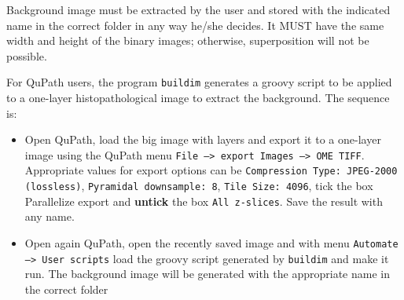 \documentclass[11pt]{report}
\begin{document}
\begin{enumerate}
Background image must be extracted by the user and stored with the indicated name
in the correct folder in any way he/she decides. It MUST have the same width and
height of the binary images; otherwise, superposition will not be possible.

For QuPath users, the program {\tt buildim} generates a groovy script to be applied to 
a one-layer histopathological image to extract the background. The sequence is:
\begin{itemize}
\item Open QuPath, load the big image with layers and export it to a one-layer
image using the QuPath menu {\tt File --> export Images --> OME TIFF}.
Appropriate values for export options can be {\tt Compression Type: JPEG-2000 
(lossless)}, {\tt Pyramidal downsample: 8}, {\tt Tile Size: 4096}, tick the box {Parallelize export} and {\bf untick} the  box {\tt All z-slices}. Save the
result with any name.
\item Open again QuPath, open the recently saved image and with menu {\tt Automate -->
User scripts} load the groovy script generated by {\tt buildim} and make it run.
The background image will be generated with the appropriate name in the correct
folder
\end{itemize}
\end{enumerate}
\newpage
\end{document}
